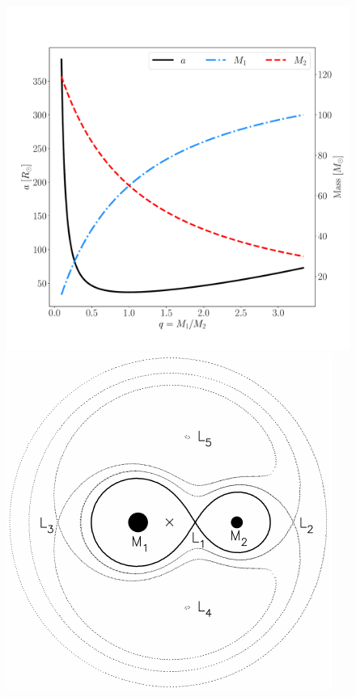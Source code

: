 \documentclass[a4paper,titlepage]{book}     	%
\begin{document}
\begin{figure}[h]
	\begin{minipage}{.55\textwidth}
		\centering
		\includegraphics[width=\textwidth]{./images/masstransfer.pdf}
	\end{minipage}
	\hfill
	\begin{minipage}{.44\textwidth}
		\centering
		\includegraphics[width=\textwidth]{./images/Rochepotential.pdf}	

\end{minipage}
\end{figure}
\end{document}

